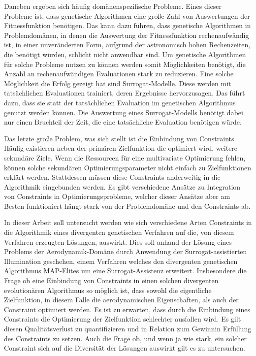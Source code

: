 Daneben ergeben sich häufig domänenspezifische Probleme.
Eines dieser Probleme ist, dass genetische Algorithmen eine große Zahl von Auswertungen der Fitnessfunktion benötigen.
Das kann dazu führen, dass genetische Algorithmen in Problemdomänen, in denen die Auswertung der Fitnessfunktion rechenaufwändig ist, in einer unveränderten Form,
aufgrund der astronomisch hohen Rechenzeiten, die benötigt würden, schlicht nicht anwendbar sind.
Um genetische Algorithmen für solche Probleme nutzen zu können werden somit Möglichkeiten benötigt, die Anzahl an rechenaufwändigen Evaluationen stark zu reduzieren.
Eine solche Möglichkeit die Erfolg gezeigt hat sind Surrogat-Modelle.
Diese werden mit tatsächlichen Evaluationen trainiert, deren Ergebnisse hervorzusagen.
Das führt dazu, dass sie statt der tatsächlichen Evaluation im genetischen Algorithmus genutzt werden können.
Die Auswertung eines Surrogat-Modells benötigt dabei nur einen Bruchteil der Zeit, die eine tatsächliche Evaluation benötigen würde.

Das letzte große Problem, was sich stellt ist die Einbindung von Constraints.
Häufig existieren neben der primären Zielfunktion die optimiert wird, weitere sekundäre Ziele.
Wenn die Ressourcen für eine multivariate Optimierung fehlen, können solche sekundären Optimierungsparameter nicht einfach zu Zielfunktionen erklärt werden.
Stattdessen müssen diese Constraints anderweitig in die Algorithmik eingebunden werden.
Es gibt verschiedene Ansätze zu Integration von Constraints in Optimierungsprobleme, welcher dieser Ansätze aber am Besten funktioniert hängt stark von der Problemdomäne und den Constraints ab.

In dieser Arbeit soll untersucht werden wie sich verschiedene Arten Constraints in die Algorithmik eines divergenten genetischen Verfahren auf die, von diesem Verfahren erzeugten Lösungen, auswirkt.
Dies soll anhand der Lösung eines Problems der Aerodynamik-Domäne durch Anwendung der Surrogat-assistierten Illumination geschehen, einem Verfahren welches den divergenten genetischen Algorithmus MAP-Elites um eine Surrogat-Assistenz erweitert.
Insbesondere die Frage ob eine Einbindung von Constraints in einen solchen divergenten evolutionären Algorithmus so möglich ist, dass sowohl die eigentliche Zielfunktion, in diesem Falle die aerodynamischen Eigenschaften, als auch der Constraint optimiert werden.
Es ist zu erwarten, dass durch die Einbindung eines Constraints die Optimierung der Zielfunktion schlechter ausfallen wird.
Es gilt diesen Qualitätsverlust zu quantifizieren und in Relation zum Gewinnin Erfüllung des Constraints zu setzen.
Auch die Frage ob, und wenn ja wie stark, ein solcher Constraint sich auf die Diversität der Lösungen auswirkt gilt es zu untersuchen.

